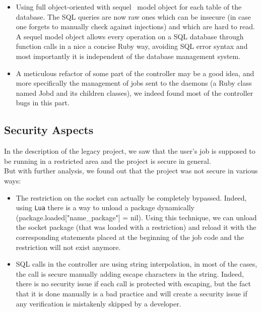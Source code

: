 \documentclass{eplmastersthesis}
\begin{document}
          \begin{itemize}
            \item Using full object-oriented with sequel~\cite{Sequel} model
            object for each table of the database. The SQL queries are now
            raw ones which can be insecure (in case one forgets to manually
            check against injections) and which are hard to read.\\
            A sequel model object allows every operation on a SQL database
            through function calls in a nice a concise Ruby way, avoiding
            SQL error syntax and most importantly it is independent of the
            database management system.
            \item A meticulous refactor of some part of the controller may be
            a good idea, and more specifically the management of jobs sent to
            the daemons (a Ruby class named Jobd and its children classes), we
            indeed found most of the controller bugs in this part.
          \end{itemize}

      \subsection{Security Aspects}

        In the description of the legacy project, we saw that the user's job is
        supposed to be running in a restricted area and the project is secure in
        general.\\
        But with further analysis, we found out that the project was not secure
        in various ways:

        \begin{itemize}
          \item The restriction on the socket can actually be completely
          bypassed. Indeed, using \texttt{Lua} there is a way to unload a package
          dynamically (package.loaded["name\_package"] = nil). Using this
          technique, we can unload the socket package (that was loaded with a
          restriction) and reload it with the corresponding statements placed
          at the beginning of the job code and the restriction will not exist
          anymore.
          \item SQL calls in the controller are using string interpolation,
          in most of the cases, the call is secure manually adding escape
          characters in the string. Indeed, there is no security issue if
          each call is protected with escaping, but the fact that it is done
          manually is a bad practice and will create a security issue if
          any verification is mistakenly skipped by a developer.
        \end{itemize}
\end{document}

